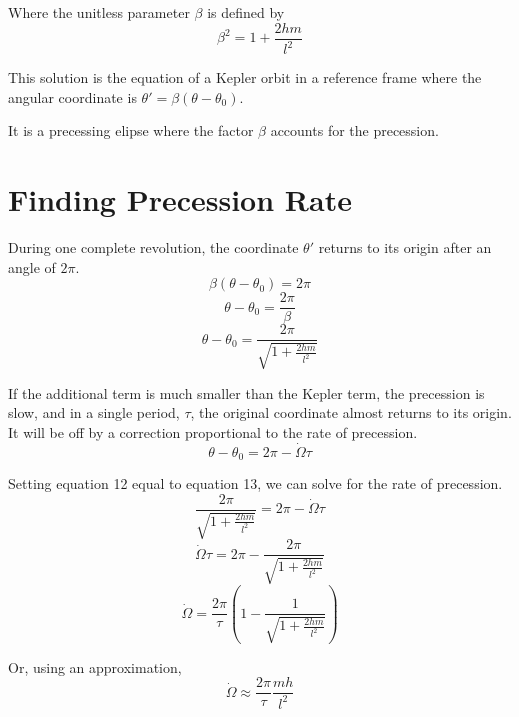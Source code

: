 \documentclass[10pt,a4paper]{article}
\begin{document}
Where the unitless parameter $\beta$ is defined by
\begin{equation}
\beta^2=1+\frac{2hm}{l^2}
\end{equation}

This solution is the equation of a Kepler orbit in a reference frame where the angular coordinate is $\theta'=\beta(\theta-\theta_0)$.


It is a precessing elipse where the factor $\beta$ accounts for the precession.
\section{Finding Precession Rate}
During one complete revolution, the coordinate $\theta'$ returns to its origin after an angle of $2\pi$.
\begin{equation}
\beta(\theta-\theta_0)=2\pi
\end{equation}
\begin{equation}
\theta-\theta_0=\frac{2\pi}{\beta}
\end{equation}
\begin{equation}
\theta-\theta_0=\frac{2\pi}{\sqrt{1+\frac{2hm}{l^2}}}
\end{equation}

If the additional term is much smaller than the Kepler term, the precession is slow, and in a single period, $\tau$, the original coordinate almost returns to its origin. It will be off by a correction proportional to the rate of precession.
\begin{equation}
\theta-\theta_0=2\pi-\dot{\Omega}\tau
\end{equation}

Setting equation 12 equal to equation 13, we can solve for the rate of precession.
\begin{equation}
\frac{2\pi}{\sqrt{1+\frac{2hm}{l^2}}}=2\pi-\dot{\Omega}\tau
\end{equation}
\begin{equation}
\dot{\Omega}\tau=2\pi-\frac{2\pi}{\sqrt{1+\frac{2hm}{l^2}}}
\end{equation}
\begin{equation}
\dot{\Omega}=\frac{2\pi}{\tau}\left(1-\frac{1}{\sqrt{1+\frac{2hm}{l^2}}}\right)
\end{equation}

Or, using an approximation,
\begin{equation}
\dot{\Omega}\approx\frac{2\pi}{\tau}\frac{mh}{l^2}
\end{equation}
\end{document}
